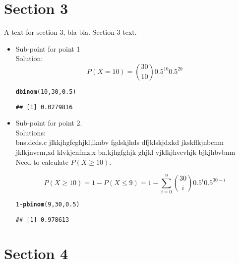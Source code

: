 \documentclass{article}\usepackage[]{graphicx}\usepackage[]{color}
\makeatletter
\newcommand{\hlnum}[1]{\textcolor[rgb]{0.686,0.059,0.569}{#1}}%
\newcommand{\hlopt}[1]{\textcolor[rgb]{0,0,0}{#1}}%
\newcommand{\hlstd}[1]{\textcolor[rgb]{0.345,0.345,0.345}{#1}}%
\newcommand{\hlkwd}[1]{\textcolor[rgb]{0.737,0.353,0.396}{\textbf{#1}}}%
\newenvironment{kframe}{%
 \def\at@end@of@kframe{}%
 \ifinner\ifhmode%
  \def\at@end@of@kframe{\end{minipage}}%
  \begin{minipage}{\columnwidth}%
 \fi\fi%
 \def\FrameCommand##1{\hskip\@totalleftmargin \hskip-\fboxsep
 \colorbox{shadecolor}{##1}\hskip-\fboxsep
     \hskip-\linewidth \hskip-\@totalleftmargin \hskip\columnwidth}%
 \MakeFramed {\advance\hsize-\width
   \@totalleftmargin\z@ \linewidth\hsize
   \@setminipage}}%
 {\par\unskip\endMakeFramed%
 \at@end@of@kframe}
\newenvironment{knitrout}{}{} %
\makeatother
\begin{document}
\section{Section 3}
A text for section 3, bla-bla. Section 3 text.

\begin{itemize}
  \item Sub-point for point 1 \\
Solution: \\
\[
P(X=10)={30 \choose 10}0.5^{10} 0.5^{20}
\]

\begin{knitrout}
\color{fgcolor}\begin{kframe}
\begin{alltt}
\hlkwd{dbinom}\hlstd{(}\hlnum{10}\hlstd{,} \hlnum{30}\hlstd{,} \hlnum{0.5}\hlstd{)}
\end{alltt}
\begin{verbatim}
## [1] 0.0279816
\end{verbatim}
\end{kframe}
\end{knitrout}

  \item Sub-point for point 2. \\
Solutions: \\  
bns.dcds.c jlkkjhgfcghjkl;lknbv fgdskjhds dfjklskjdxkd jkskflkjnbcnm jklkjnvcm,xd klvkjcnfmz,x bn,kjhgfghjk ghjkl vjklkjhvcvhjk bjkjhbvbnm \\
Need to calculate $P(X \ge 10)$.

\[
P(X \ge 10)=1-P(X \le 9)=1 - \sum_{i=0}^9 {30 \choose i}0.5^i 0.5^{30-i}
\]

\begin{knitrout}
\color{fgcolor}\begin{kframe}
\begin{alltt}
\hlnum{1}\hlopt{-}\hlkwd{pbinom}\hlstd{(}\hlnum{9}\hlstd{,} \hlnum{30}\hlstd{,} \hlnum{0.5}\hlstd{)}
\end{alltt}
\begin{verbatim}
## [1] 0.978613
\end{verbatim}
\end{kframe}
\end{knitrout}

\end{itemize}

\section{Section 4}
\end{document}
